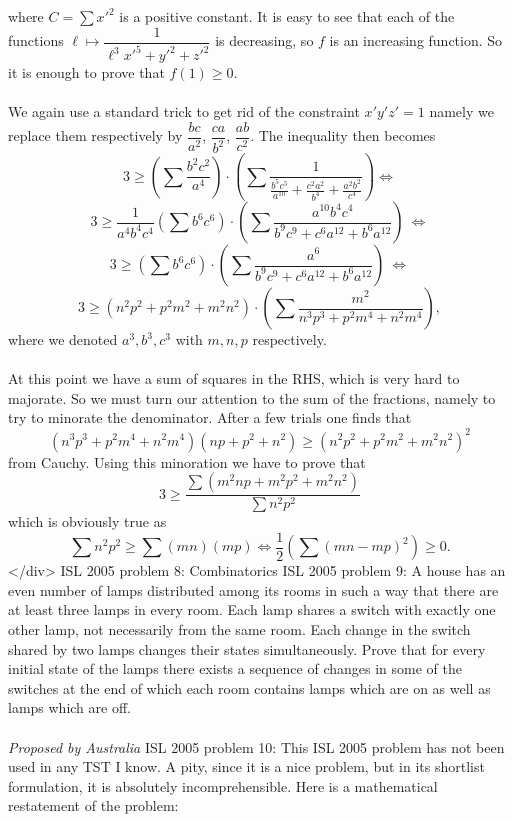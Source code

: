 where $C=\sum x'^2$ is a positive constant. It is easy to see that each of the functions $\ell \mapsto \dfrac 1 { \ell^3 x'^5 + y'^2 + z'^2 }$ is decreasing, so $f$ is an increasing function. So it is enough to prove that $f(1) \geq 0$. \\\\
We again use a standard trick to get rid of the constraint $x'y'z'=1$ namely we replace them respectively by $\dfrac {bc}{a^2}$, $\dfrac {ca}{b^2}$, $\dfrac{ab}{c^2}$. The inequality then becomes
\[
3 \geq \left( \sum  \frac { b^2c^2 }{a^4 }  \right) \cdot \left( \sum \frac 1 { \displaystyle \frac {b^5c^5}{a^{10}} + \frac {c^2a^2}{b^4} + \frac {a^2b^2}{c^4} } \right) \Leftrightarrow
\]
\[
3 \geq \frac 1{a^4b^4c^4} \left( \sum {b^6c^6} \right) \cdot \left( \sum \frac { a^{10}b^4c^4 }{ b^9c^9 + c^6a^{12} + b^6 a^{12} } \right)  \ \Leftrightarrow
\]
\[
3 \geq \left( \sum b^6 c^6 \right) \cdot \left( \sum \frac { a^6 }{ b^9c^9 + c^6a^{12} + b^6 a^{12} } \right)  \ \Leftrightarrow
\]
\[
3 \geq  ( n^2p^2 + p^2 m^2 + m^2n^2 ) \cdot \left( \sum \frac {m^2}{n^3p^3 + p^2m^4 + n^2 m^4 } \right) ,
\]
where we denoted $a^3,b^3,c^3$ with $m,n,p$ respectively. \\\\
At this point we have a sum of squares in the RHS, which is very hard to majorate. So we must turn our attention to the sum of the fractions, namely to try to minorate the denominator. After a few trials one finds that
\[ (n^3p^3 + p^2m^4 + n^2 m^4 )( np + p^2 + n^2 ) \geq ( n^2p^2 + p^2 m^2 + m^2n^2 )^2 \]
from Cauchy. Using this minoration we have to prove that
\[ 3 \geq \frac  {  \sum ( m^2np + m^2p^2 + m^2n^2 ) } { \sum  n^2p^2 } \]
which is obviously true as
\[
\sum n^2p^2 \geq \sum (mn)(mp) \Leftrightarrow \frac 12 \left ( \sum (mn-mp)^2 \right) \geq 0 .
\]
</div> 
ISL 2005 problem 8:  Combinatorics 
ISL 2005 problem 9:  A house has an even number of lamps distributed among its rooms in such a way that there are at least three lamps in every room. Each lamp shares a switch with exactly one other lamp, not necessarily from the same room. Each change in the switch shared by two lamps changes their states simultaneously. Prove that for every initial state of the lamps there exists a sequence of changes in some of the switches at the end of which each room contains lamps which are on as well as lamps which are off. \\\\
\textit{Proposed by Australia} 
ISL 2005 problem 10:  This ISL 2005 problem has not been used in any TST I know. A pity, since it is a nice problem, but in its shortlist formulation, it is absolutely incomprehensible. Here is a mathematical restatement of the problem: \\\\
